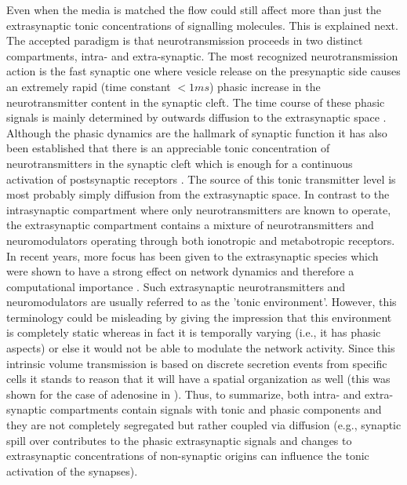 Even when the media is matched the flow could still affect more than just the extrasynaptic tonic concentrations of signalling molecules. This is explained next.  The accepted paradigm is that neurotransmission proceeds in two distinct compartments, intra- and extra-synaptic. The most recognized neurotransmission action is the fast synaptic one where vesicle release on the presynaptic side causes an extremely rapid (time constant \(<1ms\)) phasic increase in the neurotransmitter content in the synaptic cleft. The time course of these phasic signals is mainly determined by outwards diffusion to the extrasynaptic space \cite{clements1996transmitter}. Although the phasic dynamics are the hallmark of synaptic function it has also been established that there is an appreciable tonic concentration of neurotransmitters in the synaptic cleft which is enough for a continuous activation of postsynaptic receptors \cite{sah1989tonic}. The source of this tonic transmitter level is most probably simply diffusion from the extrasynaptic space. In contrast to the intrasynaptic compartment where only neurotransmitters are known to operate, the extrasynaptic compartment contains a mixture of neurotransmitters and neuromodulators operating through both ionotropic and metabotropic receptors. In recent years, more focus has been given to the extrasynaptic species which were shown to have a strong effect on network dynamics and therefore a computational importance \cite{wall2015localized,mann2010control,hamann2002tonic,lenk2016understanding,cavelier2005tonic}. Such extrasynaptic neurotransmitters and neuromodulators are usually referred to as the 'tonic environment'. However, this terminology could be misleading by giving the impression that this environment is completely static whereas in fact it is temporally varying (i.e., it has phasic aspects) or else it would not be able to modulate the network activity. Since this intrinsic volume transmission is based on discrete secretion events from specific cells it stands to reason that it will have a spatial organization as well (this was shown for the case of adenosine in \cite{wall2015localized}). Thus, to summarize, both intra- and extra-synaptic compartments contain signals with tonic and phasic components and they are not completely segregated but rather coupled via diffusion (e.g., synaptic spill over contributes to the phasic extrasynaptic signals and changes to extrasynaptic concentrations of non-synaptic origins can influence the tonic activation of the synapses).


